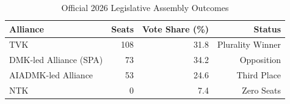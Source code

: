 
\begin{table}[htbp]
\centering
\caption{Official 2026 Legislative Assembly Outcomes}
\begin{tabular}{lrrr}
\hline
Alliance & Seats & Vote Share (\%) & Status \\
\hline
TVK & 108 & 31.8 & Plurality Winner \\
DMK-led Alliance (SPA) & 73 & 34.2 & Opposition \\
AIADMK-led Alliance & 53 & 24.6 & Third Place \\
NTK & 0 & 7.4 & Zero Seats \\
\hline
\end{tabular}
\end{table}

